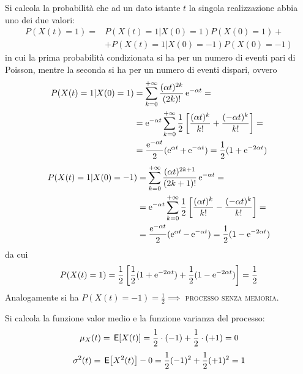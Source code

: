 Si calcola la probabilità che ad un dato istante $t$ la singola realizzazione abbia uno dei due valori:
\begin{equation}
\begin{split}
	P(X(t)=1)=&P(X(t)=1|X(0)=1)P(X(0)=1)+\\
	&+P(X(t)=1|X(0)=-1)P(X(0)=-1)
\end{split}
\end{equation}
in cui la prima probabilità condizionata si ha per un numero di eventi pari di Poisson, mentre la seconda si ha per un numero di eventi dispari, ovvero
\begin{equation}
\begin{split}
	P(X(t)=1|X(0)=1)&=\sum_{k=0}^{+\infty}{\frac{(\alpha t)^{2k}}{(2k)!}\operatorname{e}^{-\alpha t}}=\\
	&=\operatorname{e}^{-\alpha t}\sum_{k=0}^{+\infty}{\frac{1}{2}\left[\frac{(\alpha t)^k}{k!}+\frac{(-\alpha t)^k}{k!}\right]}=\\
	&=\frac{\operatorname{e}^{-\alpha t}}{2}(\operatorname{e}^{\alpha t}+\operatorname{e}^{-\alpha t})=\frac{1}{2}(1+\operatorname{e}^{-2\alpha t})
\end{split}
\end{equation}
\begin{equation}
\begin{split}
	P(X(t)=1|X(0)=-1)&=\sum_{k=0}^{+\infty}{\frac{(\alpha t)^{2k+1}}{(2k+1)!}\operatorname{e}^{-\alpha t}}=\\
	&=\operatorname{e}^{-\alpha t}\sum_{k=0}^{+\infty}{\frac{1}{2}\left[\frac{(\alpha t)^k}{k!}-\frac{(-\alpha t)^k}{k!}\right]}=\\
	&=\frac{\operatorname{e}^{-\alpha t}}{2}(\operatorname{e}^{\alpha t}-\operatorname{e}^{-\alpha t})=\frac{1}{2}(1-\operatorname{e}^{-2\alpha t})
\end{split}
\end{equation}
da cui
\begin{equation}
	P(X(t)=1)=\frac{1}{2}\left[\frac{1}{2}(1+\operatorname{e}^{-2\alpha t})+\frac{1}{2}(1-\operatorname{e}^{-2\alpha t})\right]=\frac{1}{2}
\end{equation}
Analogamente si ha $P(X(t)=-1)=\frac{1}{2} \implies$ \textsc{processo senza memoria}.

Si calcola la funzione valor medio e la funzione varianza del processo:
\begin{equation}
	\mu_X(t)=\,{\operatorname{\mathsf{E}}}\!\left[{X(t)}\right]=\frac{1}{2}\cdot(-1)+\frac{1}{2}\cdot(+1)=0
\end{equation}
\begin{equation}
	\sigma^2(t)=\,{\operatorname{\mathsf{E}}}\!\left[{X^2(t)}\right]-0=\frac{1}{2}(-1)^2+\frac{1}{2}(+1)^2=1
\end{equation}


